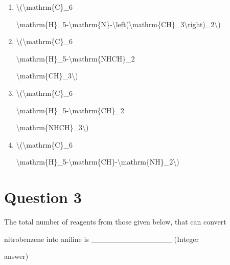 \documentclass{article}
\begin{document}
\begin{enumerate}[label=(\alph*)]
\item \textbackslash(\textbackslash mathrm\{C\}\_6

\textbackslash mathrm\{H\}\_5-\textbackslash mathrm\{N\}-\textbackslash left(\textbackslash mathrm\{CH\}\_3\textbackslash right)\_2\textbackslash)


\item \textbackslash(\textbackslash mathrm\{C\}\_6

\textbackslash mathrm\{H\}\_5-\textbackslash mathrm\{NHCH\}\_2

\textbackslash mathrm\{CH\}\_3\textbackslash)


\item \textbackslash(\textbackslash mathrm\{C\}\_6

\textbackslash mathrm\{H\}\_5-\textbackslash mathrm\{CH\}\_2

\textbackslash mathrm\{NHCH\}\_3\textbackslash)


\item \textbackslash(\textbackslash mathrm\{C\}\_6

\textbackslash mathrm\{H\}\_5-\textbackslash mathrm\{CH\}-\textbackslash mathrm\{NH\}\_2\textbackslash)


\end{enumerate}
\newpage
\section*{Question 3}
The total number of reagents from those given below, that can convert

nitrobenzene into aniline is \_\_\_\_\_\_\_\_\_\_\_\_\_\_\_ (Integer

answer)
\end{document}
